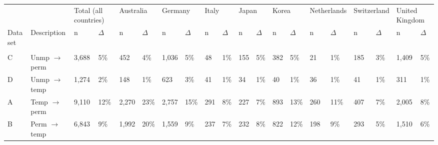 \begin{tabular}{llllllllllllllllllll}
   \toprule 
 
&  & 
\multicolumn{2}{l}{Total (all countries)} &
\multicolumn{2}{l}{Australia} &
\multicolumn{2}{l}{Germany} &
\multicolumn{2}{l}{Italy} &
\multicolumn{2}{l}{Japan} &
\multicolumn{2}{l}{Korea} &
\multicolumn{2}{l}{Netherlands} &
\multicolumn{2}{l}{Switzerland} &
\multicolumn{2}{l}{United Kingdom}
\\  
 
 
\multicolumn{1}{l}{Data set} & 
\multicolumn{1}{l}{Description} 
& n & $\Delta$
& n & $\Delta$
& n & $\Delta$
& n & $\Delta$
& n & $\Delta$
& n & $\Delta$
& n & $\Delta$
& n & $\Delta$
& n & $\Delta$
\\ 
\cmidrule(lr){1-2}
\cmidrule(lr){3-4}
\cmidrule(lr){5-6}
\cmidrule(lr){7-8}
\cmidrule(lr){9-10}
\cmidrule(lr){11-12}
\cmidrule(lr){13-14}
\cmidrule(lr){15-16}
\cmidrule(lr){17-18}
\cmidrule(lr){19-20}
\\[-1.8ex]  
 
C & Unmp $\rightarrow$ perm & 3,688 & 5\% & 452 & 4\% & 1,036 & 5\% & 48 & 1\% & 155 & 5\% & 382 & 5\% & 21 & 1\% & 185 & 3\% & 1,409 & 5\% \\ 
  D & Unmp $\rightarrow$ temp & 1,274 & 2\% & 148 & 1\% & 623 & 3\% & 41 & 1\% & 34 & 1\% & 40 & 1\% & 36 & 1\% & 41 & 1\% & 311 & 1\% \\ 
  A & Temp $\rightarrow$ perm & 9,110 & 12\% & 2,270 & 23\% & 2,757 & 15\% & 291 & 8\% & 227 & 7\% & 893 & 13\% & 260 & 11\% & 407 & 7\% & 2,005 & 8\% \\ 
  B & Perm $\rightarrow$ temp & 6,843 & 9\% & 1,992 & 20\% & 1,559 & 9\% & 237 & 7\% & 232 & 8\% & 822 & 12\% & 198 & 9\% & 293 & 5\% & 1,510 & 6\% \\ 
   \bottomrule 
\end{tabular}
